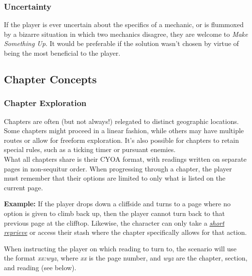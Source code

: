 \documentclass[12pt]{article}
\newcommand{\reftoit}[1]{\hyperlink{#1}{\emph{#1}}}
\begin{document}
\begin{multicols*}{2}
\subsubsection*{Uncertainty}
If the player is ever uncertain about the specifics of a mechanic, or is flummoxed by a bizarre situation in which two mechanics disagree, they are welcome to \emph{Make Something Up}. It would be preferable if the solution wasn’t chosen by virtue of being the most beneficial to the player.

\vfill
\pagebreak

\subsection{Chapter Concepts}
\subsubsection{Chapter Exploration}
Chapters are often (but not always!) relegated to distinct geographic locations. Some chapters might proceed in a linear fashion, while others may have multiple routes or allow for freeform exploration. It’s also possible for chapters to retain special rules, such as a ticking timer or pursuant enemies. \\
What all chapters share is their CYOA format, with readings written on separate pages in non-sequitur order. When progressing through a chapter, the player must remember that their options are limited to only what is listed on the current page.

\begin{tcolorbox}
\textbf{Example:} If the player drops down a cliffside and turns to a page where no option is given to climb back up, then the player cannot turn back to that previous page at the clifftop. Likewise, the character can only take a \reftoit{short reprieve} or access their stash where the chapter specifically allows for that action.
\end{tcolorbox}

When instructing the player on which reading to turn to, the scenario will use the format \emph{xx:wyz}, where \emph{xx} is the page number, and \emph{wyz} are the chapter, section, and reading (see below).


\end{multicols*}
\end{document}
